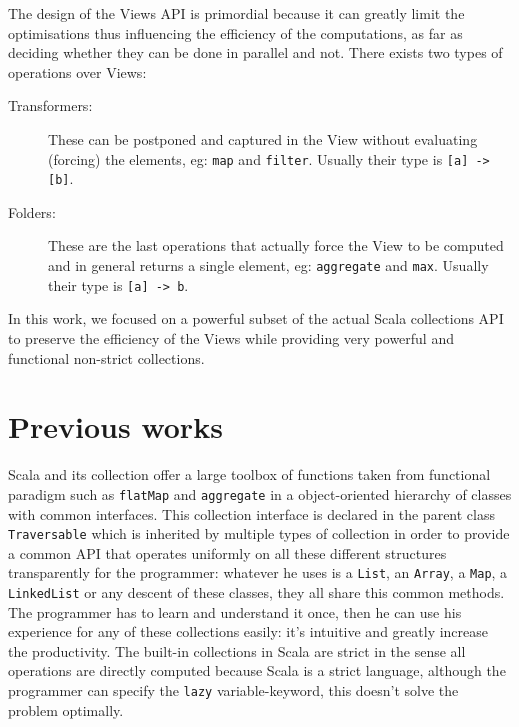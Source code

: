 \documentclass[a4paper,12pt,twocolumn]{article}
\begin{document}
The design of the Views API is primordial because it can greatly limit the optimisations thus influencing the efficiency of the computations, as far as deciding whether they can be done in parallel and not.
There exists two types of operations over Views:
\begin{description}
    \item[Transformers:] These can be postponed and captured in the View without evaluating (forcing) the elements, eg: \verb|map| and \verb|filter|. Usually their type is \verb|[a] -> [b]|.
    \item[Folders:] These are the last operations that actually force the View to be computed and in general returns a single element, eg: \verb|aggregate| and \verb|max|. Usually their type is \verb|[a] -> b|.
\end{description}
In this work, we focused on a powerful subset of the actual Scala collections API to preserve the efficiency of the Views while providing very powerful and functional non-strict collections.

\section{Previous works}
Scala and its collection offer a large toolbox of functions taken from functional paradigm such as \verb|flatMap| and \verb|aggregate| in a object-oriented hierarchy of classes with common interfaces.
This collection interface is declared in the parent class \verb|Traversable|\cite{scala-collections} which is inherited by multiple types of collection in order to provide a common API that operates uniformly on all these different structures transparently for the programmer: whatever he uses is a \verb|List|, an \verb|Array|, a \verb|Map|, a \verb|LinkedList| or any descent of these classes, they all share this common methods.
The programmer has to learn and understand it once, then he can use his experience for any of these collections easily: it's intuitive and greatly increase the productivity.
The built-in collections in Scala are strict in the sense all operations are directly computed because Scala is a strict language, although the programmer can specify the \verb|lazy| variable-keyword, this doesn't solve the problem optimally.
\end{document}
